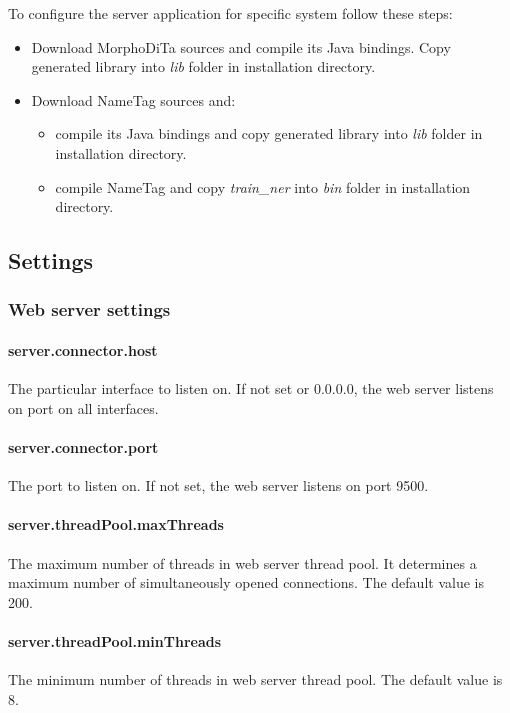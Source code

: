 \documentclass[12pt,a4paper]{report}
\begin{document}
To configure the server application for specific system follow these steps:
\begin{itemize}
\item Download MorphoDiTa sources and compile its Java bindings. Copy generated
library into \emph{lib} folder in installation directory.
\item Download NameTag sources and:
	\begin{itemize}
	\item compile its Java bindings and copy generated library into \emph{lib}
	folder in installation directory.
	\item compile NameTag and copy \emph{train\_ner} into \emph{bin} folder in
	installation directory.
	\end{itemize}
\end{itemize}

\subsection{Settings}
\label{sec:ServerSettings}

\subsubsection{Web server settings}

\paragraph{server.connector.host}
The particular interface to listen on. If not set or 0.0.0.0, the web server
listens on port on all interfaces.

\paragraph{server.connector.port}
The port to listen on. If not set, the web server listens on port 9500.

\paragraph{server.threadPool.maxThreads}
The maximum number of threads in web server thread pool. It determines a maximum
number of simultaneously opened connections. The default value is 200.

\paragraph{server.threadPool.minThreads}
The minimum number of threads in web server thread pool. The default value is 8.
\end{document}

